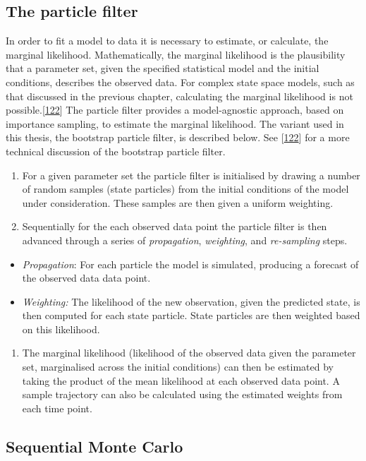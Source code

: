 \documentclass[11pt,twoside]{bristolthesis}
\providecommand{\tightlist}{%
  \setlength{\itemsep}{0pt}\setlength{\parskip}{0pt}}
\begin{document}
  \hypertarget{particle-filter}{%
  \subsection{The particle filter}\label{particle-filter}}
  
  In order to fit a model to data it is necessary to estimate, or calculate, the marginal likelihood. Mathematically, the marginal likelihood is the plausibility that a parameter set, given the specified statistical model and the initial conditions, describes the observed data. For complex state space models, such as that discussed in the previous chapter, calculating the marginal likelihood is not possible.{[}\protect\hyperlink{ref-Murray2015}{122}{]} The particle filter provides a model-agnostic approach, based on importance sampling, to estimate the marginal likelihood. The variant used in this thesis, the bootstrap particle filter, is described below. See {[}\protect\hyperlink{ref-Murray2015}{122}{]} for a more technical discussion of the bootstrap particle filter.
  \begin{enumerate}
  \def\labelenumi{\arabic{enumi}.}
  \item
    For a given parameter set the particle filter is initialised by drawing a number of random samples (state particles) from the initial conditions of the model under consideration. These samples are then given a uniform weighting.
  \item
    Sequentially for the each observed data point the particle filter is then advanced through a series of \emph{propagation}, \emph{weighting}, and \emph{re-sampling} steps.
  \end{enumerate}
  \begin{itemize}
  \item
    \emph{Propagation}: For each particle the model is simulated, producing a forecast of the observed data data point.
  \item
    \emph{Weighting:} The likelihood of the new observation, given the predicted state, is then computed for each state particle. State particles are then weighted based on this likelihood.
  \end{itemize}
  \begin{enumerate}
  \def\labelenumi{\arabic{enumi}.}
  \setcounter{enumi}{2}
  \tightlist
  \item
    The marginal likelihood (likelihood of the observed data given the parameter set, marginalised across the initial conditions) can then be estimated by taking the product of the mean likelihood at each observed data point. A sample trajectory can also be calculated using the estimated weights from each time point.
  \end{enumerate}
  \hypertarget{sequential-monte-carlo}{%
  \subsection{Sequential Monte Carlo}\label{sequential-monte-carlo}}
  
\end{document}
